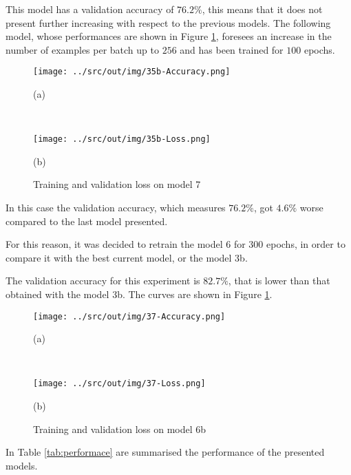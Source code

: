 \documentclass[a4paper,12pt]{article} %
\begin{document}
	This model has a validation accuracy of $76.2\%$, this means that it does 
	not present further increasing with respect to the previous models.
	The following model, whose performances are shown in Figure 
	\ref{fig:model7-performance}, foresees an increase in the number of 
	examples per batch up to $256$ and has been trained for $100$ epochs.
	
	\begin{figure}[H]
		\begin{minipage}[c]{.49\textwidth}
			\centering
			\texttt{[image: ../src/out/img/35b-Accuracy.png]}
			\caption*{(a)}
		\end{minipage}
		~
		\begin{minipage}[c]{.49\textwidth}
			\centering
			\texttt{[image: ../src/out/img/35b-Loss.png]}
			\caption*{(b)}
		\end{minipage}
		\caption{Training and validation loss on model 7}
		\label{fig:model7-performance}
	\end{figure}
	In this case the validation accuracy, which measures $76.2\%$, got $4.6\%$ 
	worse compared to the last model presented.
	
	For this reason, it was decided to retrain the model 6 for $300$ epochs, in 
	order to compare it with the best current model, or the model 3b.
	
	The validation accuracy for this experiment is $82.7\%$, that is lower than 
	that obtained with the model 3b. The curves are shown in Figure 
	\ref{fig:model7-performance}.
		
	\begin{figure}[H]
		\begin{minipage}[c]{.49\textwidth}
			\centering
			\texttt{[image: ../src/out/img/37-Accuracy.png]}
			\caption*{(a)}
		\end{minipage}
		~
		\begin{minipage}[c]{.49\textwidth}
			\centering
			\texttt{[image: ../src/out/img/37-Loss.png]}
			\caption*{(b)}
		\end{minipage}
		\caption{Training and validation loss on model 6b}
		\label{fig:model6b-performance}
	\end{figure}

	In Table \ref{tab:performace} are summarised the performance of the 
	presented models.
\end{document}
